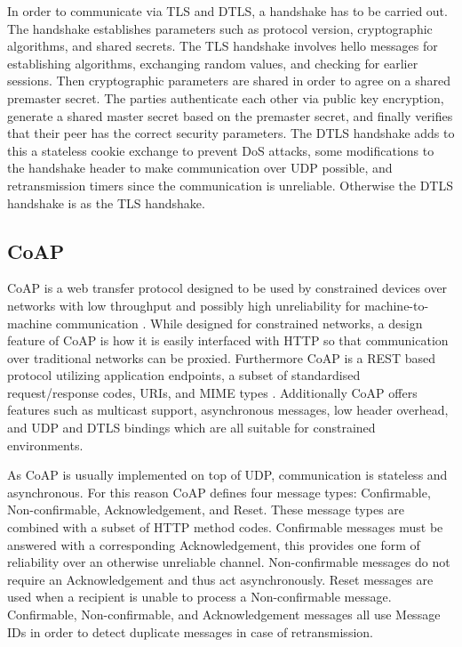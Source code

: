 \documentclass[0-thesis.tex]{subfiles}
\begin{document}
In order to communicate via TLS and DTLS, a handshake has to be carried out. The handshake
establishes parameters such as protocol version, cryptographic algorithms, and shared
secrets. The TLS handshake involves hello messages for establishing algorithms, exchanging
random values, and checking for earlier sessions. Then cryptographic parameters are shared
in order to agree on a shared premaster secret. The parties authenticate each other via
public key encryption, generate a shared master secret based on the premaster secret, and
finally verifies that their peer has the correct security parameters. The DTLS handshake
adds to this a stateless cookie exchange to prevent DoS attacks, some modifications to the
handshake header to make communication over UDP possible, and retransmission timers since
the communication is unreliable. Otherwise the DTLS handshake is as the TLS handshake.

\subsection{CoAP}
\label{ssec:coap}
CoAP is a web transfer protocol designed to be used by constrained devices over networks
with low throughput and possibly high unreliability for machine-to-machine communication
\parencite{rfc7252}. While designed for constrained networks, a design feature of CoAP is
how it is easily interfaced with HTTP so that communication over traditional networks can
be proxied. Furthermore CoAP is a REST based protocol utilizing application endpoints, a
subset of standardised request/response codes, URIs, and MIME types \parencite{rest}.
Additionally CoAP offers features such as multicast support, asynchronous messages, low
header overhead, and UDP and DTLS bindings which are all suitable for constrained
environments.

As CoAP is usually implemented on top of UDP, communication is stateless and asynchronous.
For this reason CoAP defines four message types: Confirmable, Non-confirmable,
Acknowledgement, and Reset. These message types are combined with a subset of HTTP method
codes. Confirmable messages must be answered with a corresponding Acknowledgement, this
provides one form of reliability over an otherwise unreliable channel. Non-confirmable
messages do not require an Acknowledgement and thus act asynchronously. Reset messages are
used when a recipient is unable to process a Non-confirmable message. Confirmable,
Non-confirmable, and Acknowledgement messages all use Message IDs in order to detect
duplicate messages in case of retransmission.
\end{document}
